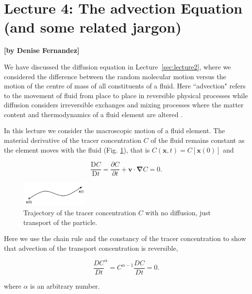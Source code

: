 
\section{Lecture 4: The advection Equation (and some related jargon)}
\begin{flushright}\textbf{[by Denise Fernandez]}\end{flushright}

We have discussed the diffusion equation in Lecture~\ref{sec:lecture2}, where we considered the difference between the random molecular motion versus the motion of the centre of mass of all constituents of a fluid. Here ``advection" refers to the movement of fluid from place to place in reversible physical processes while diffusion considers irreversible exchanges and mixing processes where the matter content and thermodynamics of a fluid element are altered \citep{Griffies2019}. 

In this lecture we consider the macroscopic motion of a fluid element. The material derivative of the tracer concentration $C$ of the fluid remains constant as the element moves with the fluid (Fig. \ref{fig:trajC}), that is $C(\boldsymbol{x},t)= C[\boldsymbol{x}(0)]$ and 

\begin{equation}
    \frac{\mathrm{D}C}{\mathrm{D}t}= \frac{\partial C}{\partial t} + \boldsymbol{v} \cdot \boldsymbol{\nabla} C = 0.
    \label{Eq:adv1}
\end{equation}

\begin{figure}[h]
\centering
\includegraphics[width=0.3\textwidth]{figures/Lecture4_fig1.png}
\caption{Trajectory of the tracer concentration $C$ with no diffusion, just transport of the particle.}
\label{fig:trajC}
\end{figure}

Here we use the chain rule and the constancy of the tracer concentration to show that advection of the transport concentration is reversible,

\begin{equation}
    \frac{DC}{Dt}^{\alpha} = C ^{\alpha -1} \frac{DC}{Dt} = 0.
    \label{Eq:adv2}
\end{equation}

where $\alpha$ is an arbitrary number. 
